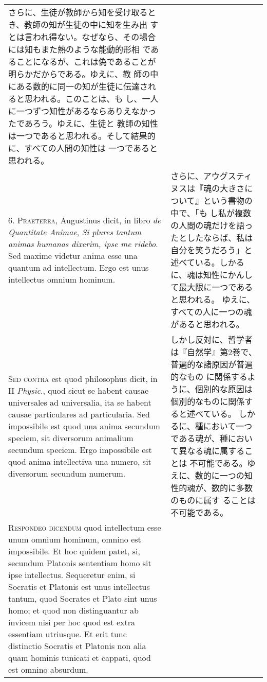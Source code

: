 \documentclass[paper=a4paper,fontsize=10pt,jafontsize=9pt,titlepage]{jlreq}
\begin{document}
\begin{longtable}{p{21em}p{21em}}
さらに、生徒が教師から知を受け取るとき、教師の知が生徒の中に知を生み出
すとは言われ得ない。なぜなら、その場合には知もまた熱のような能動的形相
であることになるが、これは偽であることが明らかだからである。ゆえに、教
師の中にある数的に同一の知が生徒に伝達されると思われる。このことは、も
し、一人に一つずつ知性があるならありえなかったであろう。ゆえに、生徒と
教師の知性は一つであると思われる。そして結果的に、すべての人間の知性は
一つであると思われる。

 
\\



6. {\scshape Praeterea}, Augustinus dicit, in libro {\itshape de
Quantitate Animae}, {\itshape Si plures tantum animas humanas dixerim,
ipse me ridebo}. Sed maxime videtur anima esse una quantum ad
intellectum. Ergo est unus intellectus omnium hominum.

&

さらに、アウグスティヌスは『魂の大きさについて』という書物の中で、「も
し私が複数の人間の魂だけを語ったとしたならば、私は自分を笑うだろう」と
述べている。しかるに、魂は知性にかんして最大限に一つであると思われる。
ゆえに、すべての人に一つの魂があると思われる。
 
\\

{\scshape Sed contra} est quod philosophus dicit, in II {\itshape
Physic}., quod sicut se habent causae universales ad universalia, ita
se habent causae particulares ad particularia. Sed impossibile est
quod una anima secundum speciem, sit diversorum animalium secundum
speciem. Ergo impossibile est quod anima intellectiva una numero, sit
diversorum secundum numerum.

&

 しかし反対に、哲学者は『自然学』第2巻で、普遍的な諸原因が普遍的なもの
 に関係するように、個別的な原因は個別的なものに関係すると述べている。
 しかるに、種において一つである魂が、種において異なる魂に属することは
 不可能である。ゆえに、数的に一つの知性的魂が、数的に多数のものに属す
 ることは不可能である。

 
\\


{\scshape Respondeo dicendum} quod intellectum esse unum omnium
 hominum, omnino est impossibile. Et hoc quidem patet, si, secundum
 Platonis sententiam homo sit ipse intellectus. Sequeretur enim, si
 Socratis et Platonis est unus intellectus tantum, quod Socrates et
 Plato sint unus homo; et quod non distinguantur ab invicem nisi per
 hoc quod est extra essentiam utriusque. Et erit tunc distinctio
 Socratis et Platonis non alia quam hominis tunicati et cappati, quod
 est omnino absurdum.


\end{longtable}
\end{document}
